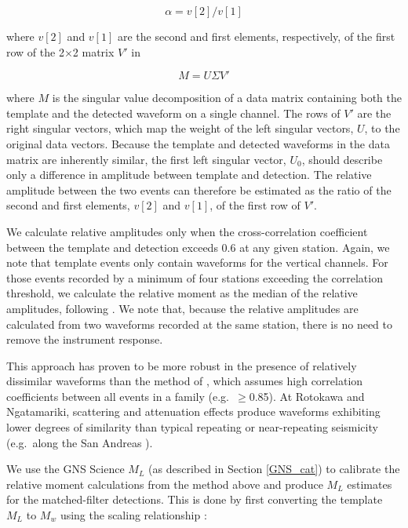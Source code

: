\begin{equation}
\alpha = v[2] / v[1]
\end{equation}

where $v[2]$ and $v[1]$ are the second and first elements, respectively, of the first row of the 2$\times$2 matrix $V'$ in

\begin{equation}
M = U\Sigma V'
\end{equation}

where $M$ is the singular value decomposition of a data matrix containing both the template and the detected waveform on a single channel. The rows of $V'$ are the right singular vectors, which map the weight of the left singular vectors, $U$, to the original data vectors. Because the template and detected waveforms in the data matrix are inherently similar, the first left singular vector, $U_0$, should describe only a difference in amplitude between template and detection. The relative amplitude between the two events can therefore be estimated as the ratio of the second and first elements, $v[2]$ and $v[1]$, of the first row of $V'$.

We calculate relative amplitudes only when the cross-correlation coefficient between the template and detection exceeds 0.6 at any given station. Again, we note that template events only contain waveforms for the vertical channels. For those events recorded by a minimum of four stations exceeding the correlation threshold, we calculate the relative moment as the median of the relative amplitudes, following \citet{Shelly_2016}. We note that, because the relative amplitudes are calculated from two waveforms recorded at the same station, there is no need to remove the instrument response.

This approach has proven to be more robust in the presence of relatively dissimilar waveforms than the method of \citet{Rubinstein_2010}, which assumes high correlation coefficients between all events in a family (e.g.\ $\geq$0.85). At Rotokawa and Ngatamariki, scattering and attenuation effects produce waveforms exhibiting lower degrees of similarity than typical repeating or near-repeating seismicity (e.g.\ along the San Andreas \citep{Rubinstein_2010}).

We use the GNS Science $M_{L}$ (as described in Section \ref{GNS_cat}) to calibrate the relative moment calculations from the method above and produce $M_{L}$ estimates for the matched-filter detections. This is done by first converting the template $M_{L}$ to $M_{w}$ using the scaling relationship \citep{Ristau_2009}:

